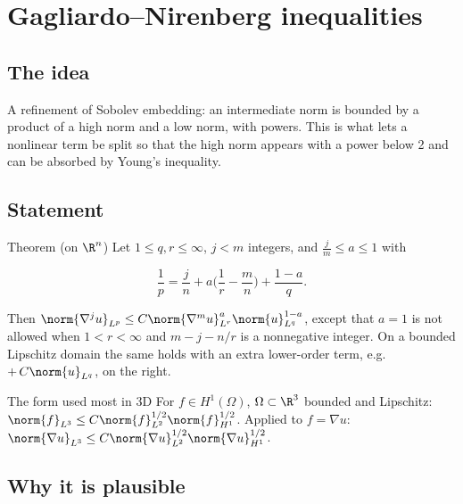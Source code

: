 
\section{Gagliardo--Nirenberg inequalities}\label{p:gagliardo-nirenberg}


\subsection*{The idea}

A refinement of Sobolev embedding: an intermediate norm is bounded by a product of a high norm and a low norm, with powers. This is what lets a nonlinear term be split so that the high norm appears with a power below 2 and can be absorbed by Young's inequality.

\subsection*{Statement}

\begin{thmbox}{Theorem (on $\R^n$)}
Let $1\le q, r\le\infty$, $j < m$ integers, and $\frac{j}{m}\le a\le 1$ with

\[ \frac1p = \frac jn + a\Big(\frac1r - \frac mn\Big) + \frac{1-a}{q}. \]

Then $\norm{\nabla^j u}_{L^p}\le C\norm{\nabla^m u}_{L^r}^{a}\norm{u}_{L^q}^{1-a}$, except that $a = 1$ is not allowed when $1< r< \infty$ and $m - j - n/r$ is a nonnegative integer. On a bounded Lipschitz domain the same holds with an extra lower-order term, e.g. $+\,C\norm{u}_{L^q}$, on the right.
\end{thmbox}

\begin{exbox}{The form used most in 3D}
For $f\in H^1(\Omega)$, $\Omega\subset\R^3$ bounded and Lipschitz: $\norm{f}_{L^3}\le C\norm{f}_{L^2}^{1/2}\norm{f}_{H^1}^{1/2}$. Applied to $f=\nabla u$: $\norm{\nabla u}_{L^3}\le C\norm{\nabla u}_{L^2}^{1/2}\norm{\nabla u}_{H^1}^{1/2}$.
\end{exbox}

\subsection*{Why it is plausible}

